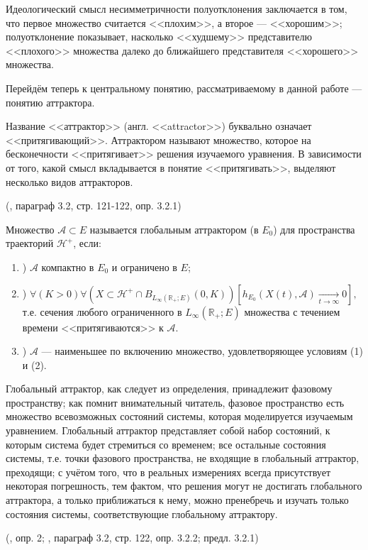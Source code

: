 Идеологический смысл несимметричности полуотклонения заключается в том,
что первое множество считается <<плохим>>, а второе --- <<хорошим>>;
полуотклонение показывает, насколько <<худшему>> представителю <<плохого>> множества далеко до ближайшего представителя <<хорошего>> множества.

Перейдём теперь к центральному понятию, рассматриваемому в данной работе --- понятию аттрактора.

Название <<аттрактор>> (англ. <<attractor>>) буквально означает <<притягивающий>>.
Аттрактором называют множество, которое на бесконечности <<притягивает>> решения изучаемого уравнения.
В зависимости от того, какой смысл вкладывается в понятие <<притягивать>>,
выделяют несколько видов аттракторов.

\opred (\cite{Zelenaya}, параграф 3.2, стр. 121-122, опр. 3.2.1)

Множество  $\mathcal{A} \subset E $ называется глобальным аттрактором (в $E_0$) для пространства траекторий $\mathcal{H}^+$, если:
\begin{enumerate}
	\item)
		$\mathcal{A}$ компактно в $E_0$ и ограничено в $E$;
	\item)
		$
			\forall(K>0)\forall(X \subset \mathcal{H}^+ \cap B_{L_{\infty}\left( \mathbb{R}_+; E \right)}(0,K))
				\left[
					h_{E_0}(X(t),\mathcal{A}) \xrightarrow[t\to \infty]{}{0}
				\right],
		$
		т.е. сечения любого ограниченного в $L_{\infty}\left( \mathbb{R}_+; E \right)$ множества с течением времени <<притягиваются>> к $\mathcal{A}$.
	\item)
		$\mathcal{A}$ --- наименьшее по включению множество, удовлетворяющее условиям (1) и (2).
\end{enumerate}


Глобальный аттрактор, как следует из определения, принадлежит фазовому пространству;
как помнит внимательный читатель, фазовое пространство есть множество всевозможных состояний системы, которая моделируется изучаемым уравнением.
Глобальный аттрактор представляет собой набор состояний, к которым система будет стремиться со временем;
все остальные состояния системы, т.е. точки фазового пространства, не входящие в глобальный аттрактор, преходящи;
с учётом того, что в реальных измерениях всегда присутствует некоторая погрешность, тем фактом, что решения могут не достигать глобального аттрактора, а только приближаться к нему, можно пренебречь и изучать только состояния системы, соответствующие глобальному аттрактору.

\opred (\cite{zhidkosti_s_pamyatyu}, опр. 2; \cite{Zelenaya}, параграф 3.2, стр. 122, опр. 3.2.2; предл. 3.2.1)

